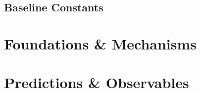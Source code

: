 \documentclass[11pt,a4paper,twoside]{book}
\theoremstyle{definition}
\theoremstyle{plain}
\begin{document}
\chapter*{Baseline Constants}


\mainmatter




\part{Foundations \& Mechanisms}
\label{part:foundations}







\part{Predictions \& Observables}
\label{part:predictions}







\end{document}
